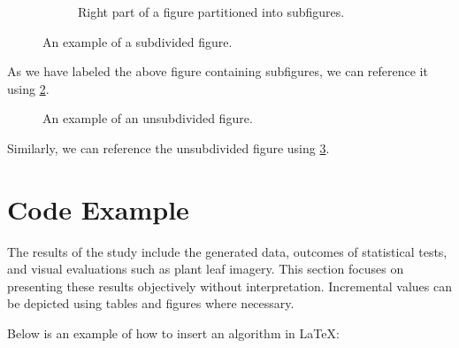 \begin{figure}[H]
\begin{subfigure}[b]{0.49\textwidth}
		\caption{Right part of a figure partitioned into subfigures.}
		\label{plddtCon2b}
	\end{subfigure}
	\caption{An example of a subdivided figure.}
	\label{subfigure_this}
\end{figure}

As we have labeled the above figure containing subfigures, we can reference it using \ref{subfigure_this}.

\begin{figure}[H]
	\centering
	\caption{An example of an unsubdivided figure.}
	\label{figured_out}
\end{figure}

Similarly, we can reference the unsubdivided figure using \ref{figured_out}.

\section{Code Example}

The results of the study include the generated data, outcomes of statistical tests, and visual evaluations such as plant leaf imagery. This section focuses on presenting these results objectively without interpretation. Incremental values can be depicted using tables and figures where necessary.

Below is an example of how to insert an algorithm in LaTeX:

